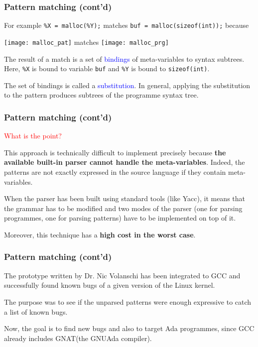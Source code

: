 \documentclass[compress,dvips,xcolor={dvipsnames},t]{beamer}
\newcommand\Ada{\textsf{Ada}\xspace}
\newcommand\Yacc{\textsf{Yacc}\xspace}
\newcommand\Linux{\textsf{Linux}\xspace}
\newcommand\GCC{\textsf{GCC}\xspace}
\newcommand\GNAT{\textsf{GNAT}\xspace}
\newcommand\GNU{\textsf{GNU}\xspace}
\begin{document}
%
\begin{frame}[containsverbatim]
\frametitle{Pattern matching (cont'd)}


For example {\small\verb|%X = malloc(%Y);|} matches
{\small\verb|buf = malloc(sizeof(int));|} because
\begin{center}
\texttt{[image: malloc\_pat]}
\quad matches \quad
\texttt{[image: malloc\_prg]}
\end{center}
The result of a match is a set of \textcolor{blue}{bindings} of
meta\hyp{}variables to syntax subtrees. Here, \verb|%X| is bound to
variable \texttt{buf} and \verb|%Y| is bound to \verb|sizeof(int)|.

The set of bindings is called a \textcolor{blue}{substitution}. In
general, applying the substitution to the pattern produces subtrees of
the programme syntax tree.

\end{frame}


% 
\begin{frame}
\frametitle{Pattern matching (cont'd)}


\textcolor{red}{What is the point?}

This approach is technically difficult to implement precisely because
\textbf{the available built\hyp{}in parser cannot handle the
  meta\hyp{}variables}. Indeed, the patterns are not exactly expressed
in the source language if they contain meta\hyp{}variables.

When the parser has been built using standard tools (like \Yacc), it
means that the grammar has to be modified and two modes of the parser
(one for parsing programmes, one for parsing patterns) have to be
implemented on top of it.

Moreover, this technique has a \textbf{high cost in the worst case}.

\end{frame}

% 
\begin{frame}
\frametitle{Pattern matching (cont'd)}


The prototype written by Dr. Nic Volanschi has been integrated to \GCC
and successfully found known bugs of a given version of the \Linux
kernel.

The purpose was to see if the unparsed patterns were enough expressive
to catch a list of known bugs.

Now, the goal is to find new bugs and also to target \Ada programmes,
since \GCC already includes \GNAT (the \GNU \Ada compiler).

\end{frame}
\end{document}
